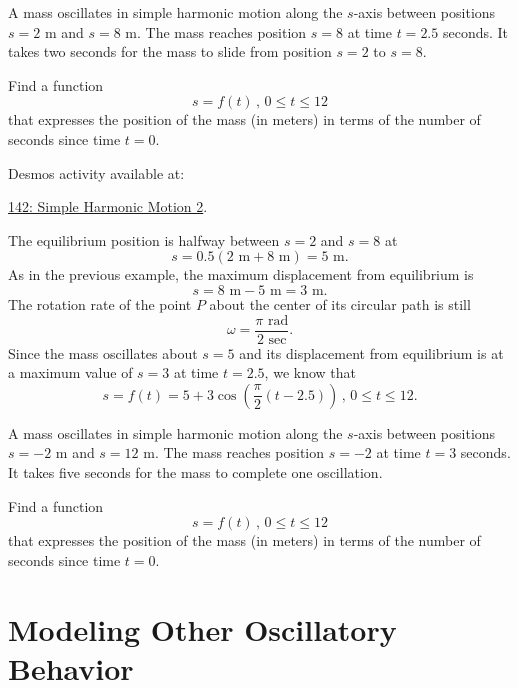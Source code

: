 \documentclass{ximera}
\begin{document}
\begin{example}  \label{Efdb56gthyn}
A mass oscillates in simple harmonic motion along the $s$-axis between positions $s=2$ m and $s=8$ m. The mass reaches position $s=8$ at time $t=2.5$ seconds. It takes two seconds for the mass to slide from position $s=2$ to $s=8$. 

Find a function
\[
   s = f(t) \, , \, 0\leq t \leq 12
\]  
that expresses the position of the mass (in meters) in terms of the number of seconds since time $t=0$.

\begin{explanation}

Desmos activity available at:

\href{https://www.desmos.com/calculator/piayt4fmno}{142: Simple Harmonic Motion 2}.

 
\begin{onlineOnly}
    \begin{center}
\end{center}
\end{onlineOnly}


The equilibrium position is halfway between $s=2$ and $s=8$ at 
\[
  s = 0.5(2 \text{ m} + 8 \text{ m}) =  5 \text{ m}.
\]
As in the previous example, the maximum displacement from equilibrium is
\[
   s = 8\text{ m} - 5\text{ m} = 3 \text{ m}.
\] 
The rotation rate of the point $P$ about the center of its circular path is still
\[
   \omega = \frac{\pi \text{ rad}}{2 \text{ sec}} .
\]
Since the mass oscillates about $s=5$ and its displacement from equilibrium is at a maximum value of $s=3$ at time $t=2.5$, we know that  
\[
  s = f(t) = 5+3\cos\left( \frac{\pi}{2}(t-2.5) \right) \, , \, 0\leq t \leq 12.
\]


\begin{question}  \label{Qdgyh5y43}
A mass oscillates in simple harmonic motion along the $s$-axis between positions $s=-2$ m and $s=12$ m. The mass reaches position $s=-2$ at time $t=3$ seconds. It takes five seconds for the mass to complete one oscillation. 

Find a function
\[
   s = f(t) \, , \, 0\leq t \leq 12
\]  
that expresses the position of the mass (in meters) in terms of the number of seconds since time $t=0$.
\end{question}


\end{explanation}
\end{example}

\section{Modeling Other Oscillatory Behavior}
\end{document}
